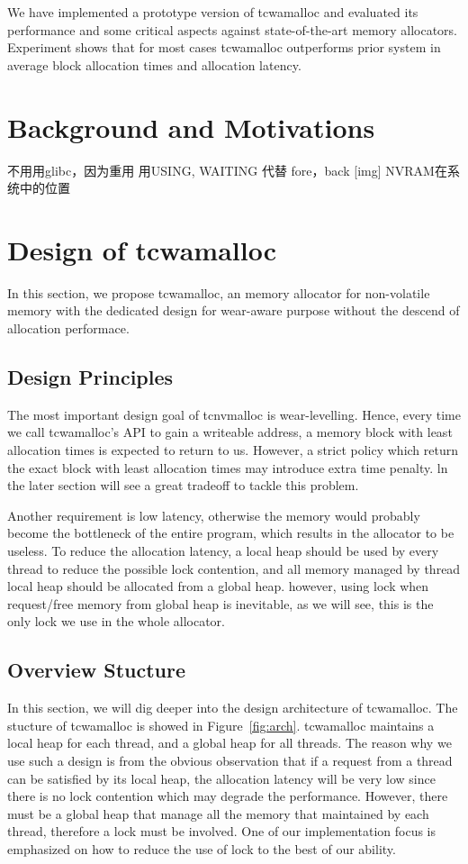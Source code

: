 \documentclass{vldb}
\begin{document}
We have implemented a prototype version of tcwamalloc and evaluated its performance and some critical aspects against state-of-the-art memory allocators. 
Experiment shows that for most cases tcwamalloc outperforms prior system in average block allocation times and allocation latency.

\section{Background and Motivations}

不用用glibc，因为重用
用USING, WAITING 代替 fore，back
[img] NVRAM在系统中的位置

\section{Design of tcwamalloc}

In this section, we propose tcwamalloc, an memory allocator for non-volatile memory with the dedicated design for wear-aware purpose without the descend of allocation performace.

\subsection{Design Principles}

The most important design goal of tcnvmalloc is wear-levelling. 
Hence, every time we call tcwamalloc’s API to gain a writeable address, 
a memory block with least allocation times is expected to return to us. 
However, a strict policy which return the exact block with least allocation times may introduce extra time penalty.
ln the later section will see a great tradeoff to tackle this problem.

Another requirement is low latency,
otherwise the memory would probably become the bottleneck of the entire program, 
which results in the allocator to be useless. 
To reduce the allocation latency, a local heap should be used by every thread to reduce the possible lock contention,
and all memory managed by thread local heap should be allocated from a global heap.
however, using lock when request/free memory from global heap is inevitable,
as we will see, this is the only lock we use in the whole allocator.

\subsection{Overview Stucture}

In this section, we will dig deeper into the design architecture of tcwamalloc.
The stucture of tcwamalloc is showed in Figure~\ref{fig:arch}.
tcwamalloc maintains a local heap for each thread, and a global heap for all threads.
The reason why we use such a design is from the obvious observation that if a request from a thread can be satisfied by its local heap,
the allocation latency will be very low since there is no lock contention which may degrade the performance.
However, there must be a global heap that manage all the memory that maintained by each thread,
therefore a lock must be involved. One of our implementation focus is emphasized on how to reduce the use of lock to the best of our ability.
\end{document}
